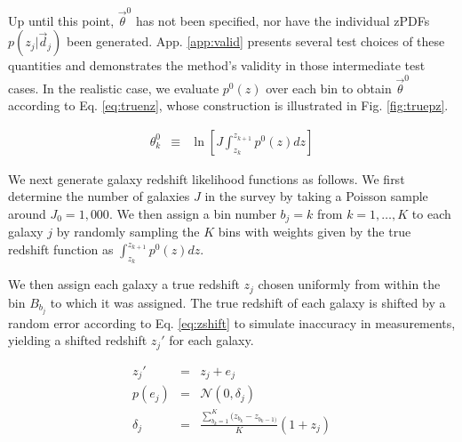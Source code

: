 \documentclass[12pt, onecolumn]{emulateapj}
\begin{document}
Up until this point, $\vec{\theta}^{0}$ has not been specified, nor have the individual zPDFs $p(z_{j}|\vec{d}_{j})$ been generated.  App. \ref{app:valid} presents several test choices of these quantities and demonstrates the method's validity in those intermediate test cases.  In the realistic case, we evaluate $p^{0}(z)$ over each bin to obtain $\vec{\theta}^{0}$ according to Eq. \ref{eq:truenz}, whose construction is illustrated in Fig. \ref{fig:truepz}.  

\begin{eqnarray}
\label{eq:truenz}
\theta_{k}^{0} &\equiv& \ln\left[J\int_{z_{k}}^{z_{k+1}}p^{0}(z) dz\right]
\end{eqnarray}

We next generate galaxy redshift likelihood functions as follows.  We first determine the number of galaxies $J$ in the survey by taking a Poisson sample around $J_{0}=1,000$.  We then assign a bin number $b_{j}=k$ from $k=1,\dots,K$ to each galaxy $j$ by randomly sampling the $K$ bins with weights given by the true redshift function as $\int_{z_{k}}^{z_{k+1}}p^{0}(z)dz$.  %


We then assign each galaxy a true redshift $z_{j}$ chosen uniformly from within the bin $B_{b_{j}}$ to which it was assigned.  The true redshift of each galaxy is shifted by a random error according to Eq. \ref{eq:zshift} to simulate inaccuracy in measurements, yielding a shifted redshift $z_{j}'$ for each galaxy.  %

\begin{mathletters}
\begin{eqnarray}
\label{eq:zshift}
z_{j}' &=& z_{j}+e_{j}\\
p(e_{j}) &=& \mathcal{N}(0,\delta_{j})\nonumber\\
\delta_{j} &=& \frac{\sum_{b_{k}=1}^{K}(z_{b_{k}}-z_{b_{k}-1)}}{K}(1+z_{j})\nonumber
\end{eqnarray}
\end{mathletters}
\end{document}
